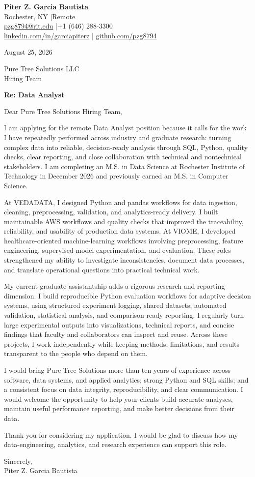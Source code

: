 \documentclass[10pt,letterpaper]{article}
\begin{document}
{\Large\bfseries\color{accent} Piter Z. Garcia Bautista}\\[-1pt]
Rochester, NY \enspace|\enspace Remote\\
\href{mailto:pzg8794@rit.edu}{pzg8794@rit.edu}
\enspace|\enspace +1 (646) 288-3300\\
\href{https://linkedin.com/in/garciapiterz}{linkedin.com/in/garciapiterz}
\enspace|\enspace
\href{https://github.com/pzg8794}{github.com/pzg8794}

\vspace{8pt}
August 25, 2026

Pure Tree Solutions LLC\\
Hiring Team

\textbf{Re: Data Analyst}

Dear Pure Tree Solutions Hiring Team,

I am applying for the remote Data Analyst position because it calls for the
work I have repeatedly performed across industry and graduate research:
turning complex data into reliable, decision-ready analysis through SQL,
Python, quality checks, clear reporting, and close collaboration with technical
and nontechnical stakeholders. I am completing an M.S. in Data Science at
Rochester Institute of Technology in December 2026 and previously earned an
M.S. in Computer Science.

At VEDADATA, I designed Python and pandas workflows for data ingestion,
cleaning, preprocessing, validation, and analytics-ready delivery. I built
maintainable AWS workflows and quality checks that improved the traceability,
reliability, and usability of production data systems. At VIOME, I developed
healthcare-oriented machine-learning workflows involving preprocessing,
feature engineering, supervised-model experimentation, and evaluation. These
roles strengthened my ability to investigate inconsistencies, document data
processes, and translate operational questions into practical technical work.

My current graduate assistantship adds a rigorous research and reporting
dimension. I build reproducible Python evaluation workflows for adaptive
decision systems, using structured experiment logging, shared datasets,
automated validation, statistical analysis, and comparison-ready reporting. I
regularly turn large experimental outputs into visualizations, technical
reports, and concise findings that faculty and collaborators can inspect and
reuse. Across these projects, I work independently while keeping methods,
limitations, and results transparent to the people who depend on them.

I would bring Pure Tree Solutions more than ten years of experience across
software, data systems, and applied analytics; strong Python and SQL skills;
and a consistent focus on data integrity, reproducibility, and clear
communication. I would welcome the opportunity to help your clients build
accurate analyses, maintain useful performance reporting, and make better
decisions from their data.

Thank you for considering my application. I would be glad to discuss how my
data-engineering, analytics, and research experience can support this role.

Sincerely,\\[10pt]
Piter Z. Garcia Bautista
\end{document}
